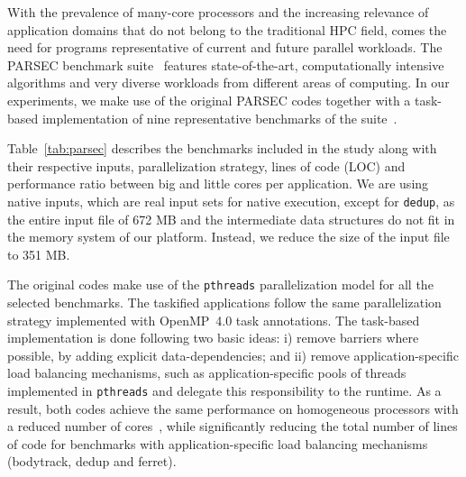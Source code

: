 With the prevalence of many-core processors and the increasing relevance of application 
domains that do not belong to the traditional HPC field, comes the need for programs 
representative of current and future parallel workloads. 
The PARSEC benchmark suite~\cite{Bienia:PhD2011} features state-of-the-art, 
computationally intensive algorithms and very diverse workloads from different areas of computing.
In our experiments, we make use of the original PARSEC codes together with a task-based 
implementation of nine representative benchmarks of the suite~\cite{Chasapis:TACO2016}. 

Table~\ref{tab:parsec} describes the benchmarks included in the study along with their respective 
inputs, parallelization strategy, lines of code (LOC) and performance ratio between big and 
little cores per application. We are using native inputs, which are real input 
sets for native execution, except for \texttt{dedup}, as the entire input file of 672 MB and the 
intermediate data structures do not fit in the memory system of our platform. Instead, 
we reduce the size of the input file to 351 MB.

The original codes make use of the \texttt{pthreads} parallelization model for all the selected benchmarks. The taskified applications follow the same parallelization strategy implemented with OpenMP~4.0 task annotations.
The task-based implementation is done following two basic ideas: i) remove barriers where possible, by adding explicit data-dependencies; and ii) remove application-specific load balancing mechanisms, such as application-specific pools of threads implemented in \texttt{pthreads} and delegate this responsibility to the runtime.
As a result, both codes achieve the same performance on homogeneous processors with a reduced number of cores~\cite{Chasapis:TACO2016}, while significantly reducing the total number of lines of code for benchmarks with application-specific load balancing mechanisms (bodytrack, dedup and ferret).



